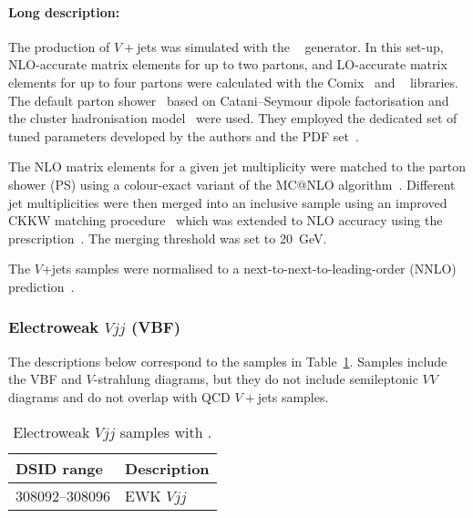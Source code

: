 \paragraph{Long description:}

The production of $V+$jets was simulated with the \SHERPA[2.2.1]~\cite{Bothmann:2019yzt}
generator. In this set-up, NLO-accurate matrix elements for up to two partons, and LO-accurate matrix elements for up
to four partons were calculated with the Comix~\cite{Gleisberg:2008fv} and
\OPENLOOPS~\cite{Buccioni:2019sur,Cascioli:2011va,Denner:2016kdg} libraries.
The default \SHERPA parton shower~\cite{Schumann:2007mg} based on
Catani--Seymour dipole factorisation and the cluster hadronisation model~\cite{Winter:2003tt}
were used. They employed the dedicated set of tuned parameters developed by the
\SHERPA authors and the \NNPDF[3.0nnlo] PDF set~\cite{Ball:2014uwa}.

The NLO matrix elements for a given jet multiplicity were matched to the parton
shower (PS) using a colour-exact variant of the MC@NLO
algorithm~\cite{Hoeche:2011fd}. Different jet multiplicities were then merged
into an inclusive sample using an improved CKKW matching
procedure~\cite{Catani:2001cc,Hoeche:2009rj} which was extended to NLO
accuracy using the \MEPSatNLO prescription~\cite{Hoeche:2012yf}. The merging threshold 
was set to \SI{20}{\GeV}.



The $V$+jets samples were normalised to a next-to-next-to-leading-order (NNLO) 
prediction~\cite{Anastasiou:2003ds}.


\subsubsection{Electroweak $Vjj$ (VBF)}

The descriptions below correspond to the samples in
Table~\ref{tab:ewkvjets-sherpa}.  Samples include the VBF and $V$-strahlung diagrams, but 
they do not include semileptonic $VV$ diagrams and do not overlap with QCD $V+$jets samples.

\begin{table}[!htbp]
  \caption{Electroweak $Vjj$ samples with \SHERPA.}%
  \label{tab:ewkvjets-sherpa}
  \centering
  \begin{tabular}{l l}
    \toprule
    DSID range & Description \\
    \midrule
    308092--308096 & EWK $Vjj$ \\
    \bottomrule
  \end{tabular}
\end{table}

